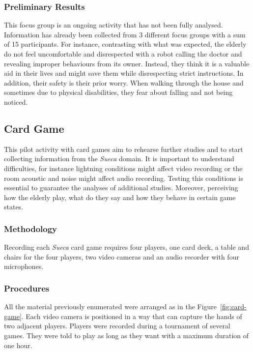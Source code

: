 \subsubsection{Preliminary Results}

This focus group is an ongoing activity that has not been fully analysed.
Information has already been collected from 3 different focus groups with a sum of 15 participants.
For instance, contrasting with what was expected, the elderly do not feel uncomfortable and disrespected with a robot calling the doctor and revealing improper behaviours from its owner.
Instead, they think it is a valuable aid in their lives and might save them while disrespecting strict instructions.
In addition, their safety is their prior worry.
When walking through the house and sometimes due to physical disabilities, they fear about falling and not being noticed.







\subsection{Card Game}
This pilot activity with card games aim to rehearse further studies and to start collecting information from the \emph{Sueca} domain.
It is important to understand difficulties, for instance lightning conditions might affect video recording or the room acoustic and noise might affect audio recording.
Testing this conditions is essential to guarantee the analyses of additional studies.
Moreover, perceiving how the elderly play, what do they say and how they behave in certain game states.

\subsubsection{Methodology}
Recording each \emph{Sueca} card game requires four players, one card deck, a table and chairs for the four players, two video cameras and an audio recorder with four microphones.

\subsubsection{Procedures}
All the material previously enumerated were arranged as in the Figure~\ref{fig:card-game}.
Each video camera is positioned in a way that can capture the hands of two adjacent players.
Players were recorded during a tournament of several games.
They were told to play as long as they want with a maximum duration of one hour.

